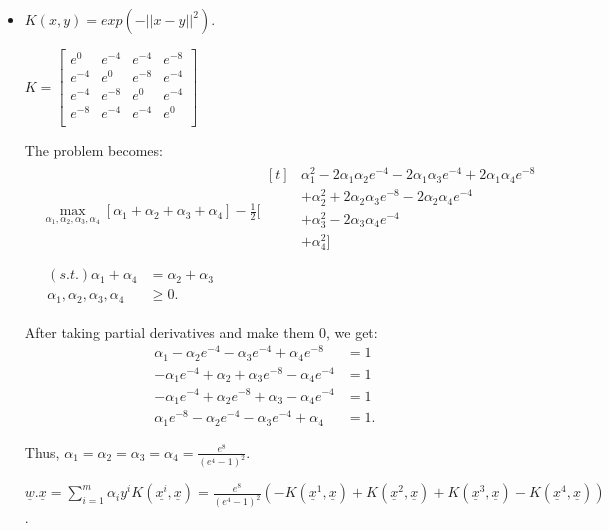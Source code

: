 \documentclass[letter, 12pt]{article}
\begin{document}
\begin{enumerate}
\begin{itemize}
    		\item{$ K(x, y) = exp(-||x - y||^2 ). $}
    		\par{}
    		$ K = \begin{bmatrix}
    		e^{0} & e^{-4} & e^{-4} & e^{-8} \\
    		e^{-4} & e^{0} & e^{-8} & e^{-4} \\
    		e^{-4} & e^{-8} & e^{0} & e^{-4} \\
    		e^{-8} & e^{-4} & e^{-4} & e^{0} \\
    		\end{bmatrix} $
    		\par{The problem becomes:}
    		\begin{align*}
    		&\max_{\alpha_1, \alpha_2, \alpha_3, \alpha_4} [\alpha_1 + \alpha_2 + \alpha_3 + \alpha_4] - \frac{1}{2} [
    		\begin{aligned}[t]
    		& \alpha_1^2 - 2\alpha_1 \alpha_2 e^{-4} - 2\alpha_1 \alpha_3 e^{-4} + 2\alpha_1 \alpha_4 e^{-8} \\
    		& +  \alpha_2^2 + 2\alpha_2 \alpha_3 e^{-8} - 2\alpha_2 \alpha_4 e^{-4} \\
    		& +  \alpha_3^2 - 2\alpha_3 \alpha_4 e^{-4} \\
    		& +  \alpha_4^2 ] \\
    		\end{aligned} \\
    		&
    		\begin{aligned}
    		(s.t.) \alpha_1 + \alpha_4 &= \alpha_2 + \alpha_3 \\
    		\alpha_1, \alpha_2, \alpha_3, \alpha_4 &\ge 0.
    		\end{aligned}
    		\end{align*}
    		\par{After taking partial derivatives and make them 0, we get:}
    		\begin{align*}
    		 \alpha_1 - \alpha_2 e^{-4} - \alpha_3 e^{-4} + \alpha_4 e^{-8} &= 1 \\
    		-\alpha_1 e^{-4} +  \alpha_2 + \alpha_3 e^{-8} - \alpha_4 e^{-4} &= 1 \\
    		- \alpha_1 e^{-4} + \alpha_2 e^{-8} +  \alpha_3 - \alpha_4 e^{-4} &= 1 \\
    		\alpha_1 e^{-8} - \alpha_2 e^{-4} - \alpha_3 e^{-4} +  \alpha_4 &= 1 .
    		\end{align*}
    		\par{Thus, $ \alpha_1 = \alpha_2 = \alpha_3 = \alpha_4 = \frac{e^8}{(e^4 - 1)^2} $.}
    		\par{$ \underline{w}.\underline{x} = \sum_{i=1}^m \alpha_i y^i K(\underline{x^i}, \underline{x}) =  \frac{e^8}{(e^4 - 1)^2}(-K(\underline{x}^1, \underline{x}) + K(\underline{x}^2, \underline{x}) + K(\underline{x}^3, \underline{x}) - K(\underline{x}^4, \underline{x}))$.}

\end{itemize}
\end{enumerate}
\end{document}
